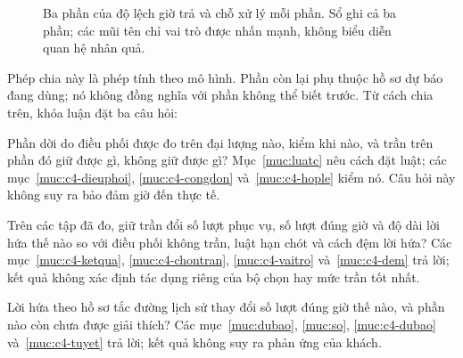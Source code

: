 \begin{figure}[htbp]
\centering
{}
\caption{Ba phần của độ lệch giờ trả và chỗ xử lý mỗi phần. Sổ ghi cả ba phần; các mũi tên chỉ vai trò
được nhấn mạnh, không biểu diễn quan hệ nhân quả.}
\label{hinh:c1-baphan}
\end{figure}

Phép chia này là phép tính theo mô hình. Phần còn lại phụ thuộc hồ sơ dự báo đang dùng; nó không đồng nghĩa với
phần không thể biết trước. Từ cách chia trên, khóa luận đặt ba câu hỏi:
\begin{description}[leftmargin=1.15cm,style=nextline,itemsep=3pt]
\item[CH1.] Phần dời do điều phối được đo trên đại lượng nào, kiểm khi nào, và trần trên phần đó giữ được gì,
không giữ được gì? Mục~\ref{muc:luatc} nêu cách đặt luật; các mục~\ref{muc:c4-dieuphoi},
\ref{muc:c4-congdon} và~\ref{muc:c4-hople} kiểm nó. Câu hỏi này không suy ra bảo đảm giờ đến thực tế.
\item[CH2.] Trên các tập đã đo, giữ trần đổi số lượt phục vụ, số lượt đúng giờ và độ dài lời hứa thế nào so với
điều phối không trần, luật hạn chót và cách đệm lời hứa? Các mục~\ref{muc:c4-ketqua}, \ref{muc:c4-chontran},
\ref{muc:c4-vaitro} và~\ref{muc:c4-dem} trả lời; kết quả không xác định tác dụng riêng của bộ chọn hay mức trần tốt nhất.
\item[CH3.] Lời hứa theo hồ sơ tắc đường lịch sử thay đổi số lượt đúng giờ thế nào, và phần nào còn chưa được
giải thích? Các mục~\ref{muc:dubao}, \ref{muc:so}, \ref{muc:c4-dubao} và~\ref{muc:c4-tuyet} trả lời;
kết quả không suy ra phản ứng của khách.
\end{description}

